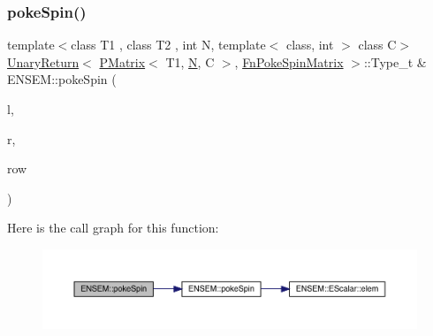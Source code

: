 \subsubsection{\texorpdfstring{pokeSpin()}{pokeSpin()}\hspace{0.1cm}{\footnotesize\ttfamily [1/2]}}
{\footnotesize\ttfamily template$<$class T1 , class T2 , int N, template$<$ class, int $>$ class C$>$ \\
\mbox{\hyperlink{structENSEM_1_1UnaryReturn}{Unary\+Return}}$<$ \mbox{\hyperlink{classENSEM_1_1PMatrix}{P\+Matrix}}$<$ T1, \mbox{\hyperlink{adat__devel_2lib_2hadron_2operator__name__util_8cc_a7722c8ecbb62d99aee7ce68b1752f337}{N}}, C $>$, \mbox{\hyperlink{structENSEM_1_1FnPokeSpinMatrix}{Fn\+Poke\+Spin\+Matrix}} $>$\+::Type\+\_\+t \& E\+N\+S\+E\+M\+::poke\+Spin (\begin{DoxyParamCaption}\item[{\mbox{\hyperlink{classENSEM_1_1PMatrix}{P\+Matrix}}$<$ T1, \mbox{\hyperlink{adat__devel_2lib_2hadron_2operator__name__util_8cc_a7722c8ecbb62d99aee7ce68b1752f337}{N}}, C $>$ \&}]{l,  }\item[{const \mbox{\hyperlink{classENSEM_1_1PMatrix}{P\+Matrix}}$<$ T2, \mbox{\hyperlink{adat__devel_2lib_2hadron_2operator__name__util_8cc_a7722c8ecbb62d99aee7ce68b1752f337}{N}}, C $>$ \&}]{r,  }\item[{int}]{row }\end{DoxyParamCaption})\hspace{0.3cm}{\ttfamily [inline]}}

Here is the call graph for this function\+:\nopagebreak
\begin{figure}[H]
\begin{center}
\leavevmode
\includegraphics[width=350pt]{df/d0a/group__primmatrix_ga738f0f1d3bad8770111452c72714a4ae_cgraph}
\end{center}
\end{figure}
\mbox{\label{group__primmatrix_gaf6f04aa80d2490f962a3132eb16fa98a}} 
